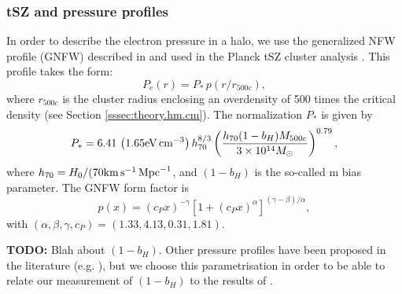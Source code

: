 \documentclass[useAMS,usenatbib]{mn2e}
\newcommand{\todo}[1]{{\bf TODO:} #1}
\begin{document}
    \subsubsection{tSZ and pressure profiles}\label{sssec:theory.hm.pe}
      In order to describe the electron pressure in a halo, we use the generalized NFW profile (GNFW) described in \cite{2010A&A...517A..92A} and used in the Planck tSZ cluster analysis \cite{2016A&A...594A..24P}. This profile takes the form:
      \begin{equation}
        P_e(r)=P_*\,p(r/r_{500c}),
      \end{equation}
      where $r_{500c}$ is the cluster radius enclosing an overdensity of 500 times the critical density (see Section \ref{sssec:theory.hm.cm}). The normalization $P_*$ is given by
      \begin{equation}
        P_*=6.41\,\left(1.65 {\rm eV}\,{\rm cm}^{-3}\right)h_{70}^{8/3}
        \left(\frac{h_{70}(1-b_H)M_{500c}}{3\times10^{14}M_\odot}\right)^{0.79},
      \end{equation}
      where $h_{70}=H_0/(70 {\rm km}\,{\rm s}^{-1}\,{\rm Mpc}^{-1}$, and $(1-b_H)$ is the so-called m bias parameter. The GNFW form factor is
      \begin{equation}
        p(x)=(c_P x)^{-\gamma}\left[1+(c_P x)^\alpha\right]^{(\gamma-\beta)/\alpha},
      \end{equation}
      with $(\alpha,\beta,\gamma,c_P)=(1.33,4.13,0.31,1.81)$.
      
      \todo{Blah about $(1-b_H)$}. Other pressure profiles have been proposed in the literature (e.g. \cite{2012ApJ...758...75B}), but we choose this parametrisation in order to be able to relate our measurement of $(1-b_H)$ to the results of \cite{2016A&A...594A..24P}.
      
\end{document}
